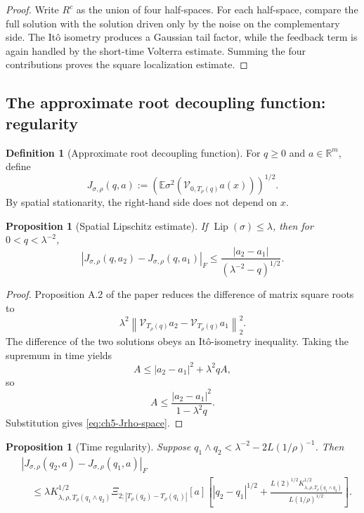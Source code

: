 \documentclass[11pt]{article}
\newtheorem{proposition}[theorem]{Proposition}
\theoremstyle{definition}
\newtheorem{definition}[theorem]{Definition}
\theoremstyle{remark}
\newcommand{\R}{\mathbb{R}}
\newcommand{\E}{\mathbb{E}}
\newcommand{\Lip}{\operatorname{Lip}}
\newcommand{\norm}[1]{\left\lVert #1\right\rVert}
\newcommand{\abs}[1]{\left\lvert #1\right\rvert}
\newcommand{\V}{\mathcal{V}}
\newcommand{\Trho}{T_{\rho}}
\begin{document}
\begin{proof}
Write \(R^c\) as the union of four half-spaces. For each half-space, compare the full solution with the solution driven only by the noise on the complementary side. The It\^o isometry produces a Gaussian tail factor, while the feedback term is again handled by the short-time Volterra estimate. Summing the four contributions proves the square localization estimate.
\end{proof}

\subsection{The approximate root decoupling function: regularity}

\begin{definition}[Approximate root decoupling function]\label{def:ch5-Jrho}
For \(q\ge0\) and \(a\in\R^m\), define
\begin{equation}\label{eq:ch5-Jrho}
J_{\sigma,\rho}(q,a)
:=\left(\E\sigma^2\!\left(\V_{0,\Trho(q)}a(x)\right)\right)^{1/2}.
\end{equation}
By spatial stationarity, the right-hand side does not depend on \(x\).
\end{definition}

\begin{proposition}[Spatial Lipschitz estimate]\label{prop:ch5-Jrho-space}
If \(\Lip(\sigma)\le\lambda\), then for \(0<q<\lambda^{-2}\),
\begin{equation}\label{eq:ch5-Jrho-space}
\abs{J_{\sigma,\rho}(q,a_2)-J_{\sigma,\rho}(q,a_1)}_F
\le
\frac{|a_2-a_1|}{(\lambda^{-2}-q)^{1/2}}.
\end{equation}
\end{proposition}

\begin{proof}
Proposition A.2 of the paper reduces the difference of matrix square roots to
\[
\lambda^2\norm{\V_{\Trho(q)}a_2-\V_{\Trho(q)}a_1}_2^2.
\]
The difference of the two solutions obeys an It\^o-isometry inequality. Taking the supremum in time yields
\[
A\le |a_2-a_1|^2+\lambda^2qA,
\]
so
\[
A\le\frac{|a_2-a_1|^2}{1-\lambda^2q}.
\]
Substitution gives \eqref{eq:ch5-Jrho-space}.
\end{proof}

\begin{proposition}[Time regularity]\label{prop:ch5-Jrho-time}
Suppose \(q_1\wedge q_2<\lambda^{-2}-2L(1/\rho)^{-1}\). Then
\begin{align}\label{eq:ch5-Jrho-time}
&|J_{\sigma,\rho}(q_2,a)-J_{\sigma,\rho}(q_1,a)|_F
\\
&\quad\le
\lambda K_{\lambda,\rho,\Trho(q_1\wedge q_2)}^{1/2}
\Xi_{2;|\Trho(q_2)-\Trho(q_1)|}[a]
\left[
|q_2-q_1|^{1/2}
+\frac{L(2)^{1/2}K_{\lambda,\rho,\Trho(q_1\wedge q_2)}^{1/2}}
{L(1/\rho)^{1/2}}
\right].
\end{align}
\end{proposition}
\end{document}
